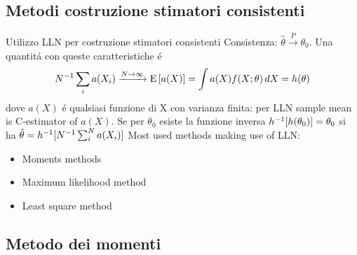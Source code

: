 \documentclass[asd-beamer.tex]{subfiles}
\begin{document}
\subsection{Metodi costruzione stimatori consistenti}

\begin{frame}{Utilizzo LLN per costruzione stimatori consistenti}\frameintoc
Consistenza: $\hat{\theta}\xrightarrow{P}\theta_0$. Una quantit\'a con queste caratteristiche \'e
\[{N}^{-1}\sum_ia(X_i)\xrightarrow{N\to\infty}\operatorname{E}{[a(X)]}=\int a(X)f(X;\theta)\,dX=h(\theta)\]
dove $a(X)$ \'e qualsiasi funzione di X con varianza finita: per LLN sample mean is C-estimator of $a(X)$. Se per $\theta_0$ esiste la funzione inversa ${h}^{-1}[h(\theta_0)]=\theta_0$ si ha $\hat{\theta}={h}^{-1}[{N}^{-1}\sum_i^Na(X_i)]$
Most used methods making use of LLN:
\begin{itemize}
\item Moments methods
\item Maximum likelihood method
\item Least square method
\end{itemize}
\end{frame}

\subsection{Metodo dei momenti}
\end{document}
